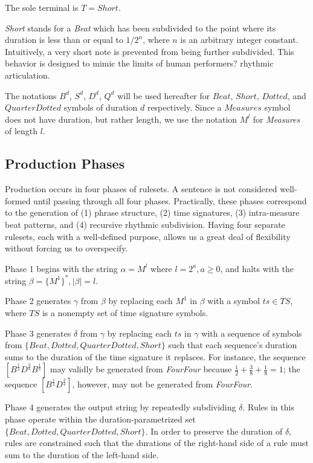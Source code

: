 \documentclass{article}
\begin{document}
The sole terminal is $T={Short}$.

\emph{Short} stands for a \emph{Beat} which has been subdivided to the point where its duration is less than or equal to $1/2^n$, where $n$ is an arbitrary integer constant. Intuitively, a very short note is prevented from being further subdivided. This behavior is designed to mimic the limits of human performers? rhythmic articulation.

The notations $B^d$, $S^d$, $D^d$, $Q^d$ will be used hereafter for $Beat$, $Short$, $Dotted$, and $QuarterDotted$ symbols of duration $d$ respectively. Since a $Measures$ symbol does not have duration, but rather length, we use the notation $M^l$ for \emph{Measures} of length $l$.

\subsection{Production Phases}


Production occurs in four phases of rulesets. A sentence is not considered well-formed until passing through all four phases. Practically, these phases correspond to the generation of (1) phrase structure, (2) time signatures, (3) intra-measure beat patterns, and (4) recursive rhythmic subdivision. Having four separate rulesets, each with a well-defined purpose, allows us a great deal of flexibility without forcing us to overspecify.

Phase 1 begins with the string $\alpha = M^l$ where $l=2^a, a \geq 0$, and halts with the string $\beta = \{ M^1 \}^*, |\beta| = l$.

Phase 2 generates $\gamma$ from $\beta$ by replacing each $M^1$ in $\beta$ with a symbol $ts \in TS$, where $TS$ is a nonempty set of time signature symbols.

Phase 3 generates $\delta$ from $\gamma$ by replacing each $ts$ in $\gamma$ with a sequence of symbols from $\{Beat,\allowbreak Dotted,\allowbreak QuarterDotted,\allowbreak Short \}$ such that each sequence's duration sums to the duration of the time signature it replaces. For instance, the sequence $[B^\frac{1}{2} D^\frac{3}{8} B^\frac{1}{8}]$ may validly be generated from \emph{FourFour} because $\frac{1}{2} + \frac{3}{8} + \frac{1}{8} = 1$; the sequence $[B^\frac{1}{2} D^\frac{3}{4}]$, however, may not be generated from \emph{FourFour}.

Phase 4 generates the output string by repeatedly subdividing $\delta$. Rules in this phase operate within the duration-parametrized set $\{Beat,\allowbreak Dotted,\allowbreak QuarterDotted,\allowbreak Short\}$. In order to preserve the duration of $\delta$, rules are constrained such that the durations of the right-hand side of a rule must sum to the duration of the left-hand side.
\end{document}
